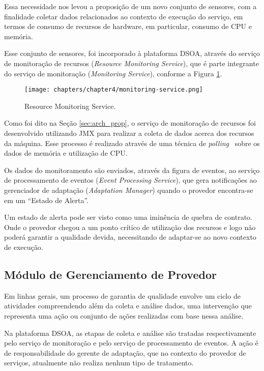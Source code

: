 Essa necessidade nos levou a proposição de um novo conjunto de sensores, com a finalidade coletar dados relacionados ao contexto de execução do serviço, em termos de consumo de recursos de hardware, em particular, consumo de CPU e memória. 

Esse conjunto de sensores, foi incorporado à plataforma DSOA, através do serviço de monitoração de recursos (\textit{Resource Monitoring Service}), que é parte integrante do serviço de monitoração (\textit{Monitoring Service}), conforme a Figura \ref{fig:resc_module}.

\begin{figure}[htp]
\centering
\texttt{[image: chapters/chapter4/monitoring-service.png]}
\caption[Resource Monitoring Service]{Resource Monitoring Service.}
\label{fig:resc_module}
\end{figure}

Como foi dito na Seção \ref{sec:arch_prop}, o serviço de monitoração de recursos foi desenvolvido utilizando JMX para realizar a coleta de dados acerca dos recursos da máquina. Esse processo é realizado através de uma técnica de \textit{polling}~\cite{patterson2005organizacao} sobre os dados de memória e utilização de CPU.

Os dados do monitoramento são enviados, através da figura de eventos, ao serviço de processamento de eventos (\textit{Event Processing Service}), que gera notificações ao gerenciador de adaptação (\textit{Adaptation Manager}) quando o provedor encontra-se em um ``Estado de Alerta''.

Um estado de alerta pode ser visto como uma iminência de quebra de contrato. Onde o provedor chegou a um ponto crítico de utilização dos recursos e logo não poderá garantir a qualidade devida, necessitando de adaptar-se ao novo contexto de execução.

\subsection{Módulo de Gerenciamento de Provedor}
\label{subsec:qos_provider}
Em linhas gerais, um processo de garantia de qualidade envolve um ciclo de atividades compreendendo além da coleta e análise dados, uma intervenção que representa uma ação ou conjunto de ações realizadas com base nessa análise. 

Na plataforma DSOA, as etapas de coleta e análise são tratadas respectivamente pelo serviço de monitoração e pelo serviço de processamento de eventos. A ação é de responsabilidade do gerente de adaptação, que no contexto do provedor de serviços, atualmente não realiza nenhum tipo de tratamento.

